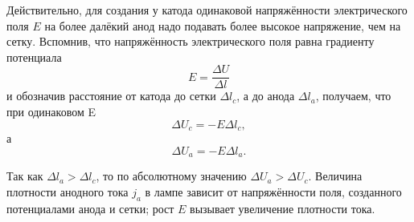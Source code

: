 \documentclass[a4paper,10pt]{book}
\begin{document}
Действительно, для создания у катода одинаковой напряжённости электрического поля $E$ на более далёкий анод надо подавать более высокое напряжение, чем на сетку. Вспомнив, что напряжённость электрического поля равна градиенту потенциала\begin{equation*}
E = \frac{\Delta U}{\Delta l}
\end{equation*} и обозначив расстояние от катода до сетки $\Delta l_c$, а до анода $\Delta l_a$, получаем, что при одинаковом E\begin{equation*}
\Delta U_c = -E\Delta l_c,
\end{equation*} а \begin{equation*}
\Delta U_a = -E\Delta l_a.
\end{equation*}

Так как $\Delta l_a>\Delta l_c$, то по абсолютному значению $\Delta U_a>\Delta U_c$. Величина плотности анодного тока $j_a$ в лампе зависит от напряжённости поля, созданного потенциалами анода и сетки; рост $E$ вызывает увеличение плотности тока.
\end{document}
